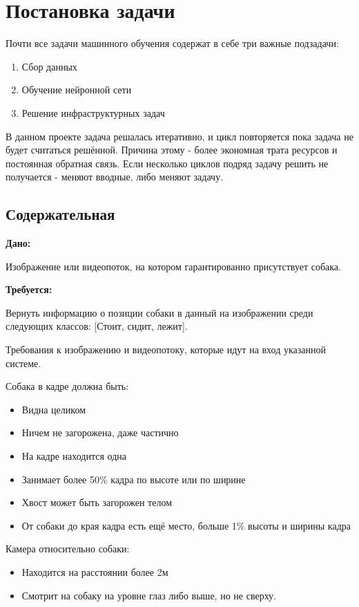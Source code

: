 \chapter{Постановка задачи} \label{chapt2}

Почти все задачи машинного обучения содержат в себе три важные подзадачи:
\begin{enumerate}
    \item Сбор данных
    \item Обучение нейронной сети
    \item Решение инфраструктурных задач
\end{enumerate}

В данном проекте задача решалась итеративно, и цикл повторяется пока задача не будет считаться решённой. Причина этому - более экономная трата ресурсов и постоянная обратная связь. Если несколько циклов подряд задачу решить не получается - меняют вводные, либо меняют задачу. 

\section{Содержательная} \label{sect2_1}
\textbf{Дано: } 

Изображение или видеопоток, на котором гарантированно присутствует собака.

\textbf{Требуется: } 

Вернуть информацию о позиции собаки в данный на изображении среди следующих классов: [Стоит, сидит, лежит].

Требования к изображению и видеопотоку, которые идут на вход указанной системе. 

Собака в кадре должна быть:
\begin{itemize}
    \item Видна целиком
    \item Ничем не загорожена, даже частично
    \item На кадре находится одна
    \item Занимает более 50\% кадра по высоте или по ширине
    \item Хвост может быть загорожен телом 
    \item От собаки до края кадра есть ещё место, больше 1\% высоты и ширины кадра
 \end{itemize}
 
Камера относительно собаки:
\begin{itemize}
    \item Находится на расстоянии более 2м
    \item Смотрит на собаку на уровне глаз либо выше, но не сверху.
\end{itemize}

